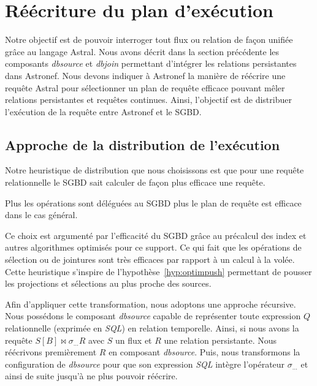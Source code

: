 \section{Réécriture du plan d'exécution}\label{sec:contrib:asteroid:reecriture}
Notre objectif est de pouvoir interroger tout flux ou relation de façon unifiée grâce au langage Astral. Nous avons décrit dans la section précédente les composants \textit{dbsource} et \textit{dbjoin} permettant d'intégrer les relations persistantes dans Astronef. Nous devons indiquer à Astronef la manière de réécrire une requête Astral pour sélectionner un plan de requête efficace pouvant mêler relations persistantes et requêtes continues. Ainsi, l'objectif est de distribuer l'exécution de la requête entre Astronef et le SGBD.

\subsection{Approche de la distribution de l'exécution}
Notre heuristique de distribution que nous choisissons est que pour une requête relationnelle le SGBD sait calculer de façon plus efficace une requête.

\begin{hyp}\label{hyp:sgbd}
    Plus les opérations sont déléguées au SGBD plus le plan de requête est efficace dans le cas général.
\end{hyp}

Ce choix est argumenté par l'efficacité du SGBD grâce au précalcul des index et autres algorithmes optimisés pour ce support. Ce qui fait que les opérations de sélection ou de jointures sont très efficaces par rapport à un calcul à la volée. Cette heuristique s'inspire de l'hypothèse~\ref{hyp:optimpush} permettant de pousser les projections et sélections au plus proche des sources.

Afin d'appliquer cette transformation, nous adoptons une approche récursive. Nous possédons le composant \textit{dbsource} capable de représenter toute expression $Q$ relationnelle (exprimée en \textit{SQL}) en relation temporelle. Ainsi, si nous avons la requête $S[B] \Join \sigma_{...} R$ avec $S$ un flux et $R$ une relation persistante. Nous réécrivons premièrement $R$ en composant \textit{dbsource}. Puis, nous transformons la configuration de \textit{dbsource} pour que son expression \textit{SQL} intègre l'opérateur $\sigma_{...}$ et ainsi de suite jusqu'à ne plus pouvoir réécrire.

